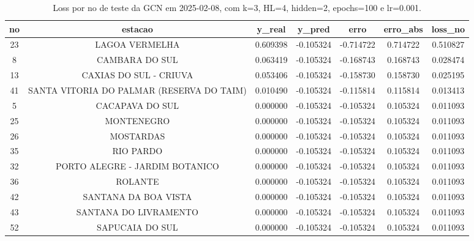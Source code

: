 \begin{table}[h]
\centering
\caption{Loss por no de teste da GCN em 2025-02-08, com k=3, HL=4, hidden=2, epochs=100 e lr=0.001.}
\label{tab:gcn_loss_k3_hl4_h2_e100_d20250208}
\begin{tabular}{ccccccc}
\toprule
no & estacao & y\_real & y\_pred & erro & erro\_abs & loss\_no \\
\midrule
23 & LAGOA VERMELHA & 0.609398 & -0.105324 & -0.714722 & 0.714722 & 0.510827 \\
8 & CAMBARA DO SUL & 0.063419 & -0.105324 & -0.168743 & 0.168743 & 0.028474 \\
13 & CAXIAS DO SUL - CRIUVA & 0.053406 & -0.105324 & -0.158730 & 0.158730 & 0.025195 \\
41 & SANTA VITORIA DO PALMAR (RESERVA DO TAIM) & 0.010490 & -0.105324 & -0.115814 & 0.115814 & 0.013413 \\
5 & CACAPAVA DO SUL & 0.000000 & -0.105324 & -0.105324 & 0.105324 & 0.011093 \\
25 & MONTENEGRO & 0.000000 & -0.105324 & -0.105324 & 0.105324 & 0.011093 \\
26 & MOSTARDAS & 0.000000 & -0.105324 & -0.105324 & 0.105324 & 0.011093 \\
35 & RIO PARDO & 0.000000 & -0.105324 & -0.105324 & 0.105324 & 0.011093 \\
32 & PORTO ALEGRE - JARDIM BOTANICO & 0.000000 & -0.105324 & -0.105324 & 0.105324 & 0.011093 \\
36 & ROLANTE & 0.000000 & -0.105324 & -0.105324 & 0.105324 & 0.011093 \\
42 & SANTANA DA BOA VISTA & 0.000000 & -0.105324 & -0.105324 & 0.105324 & 0.011093 \\
43 & SANTANA DO LIVRAMENTO & 0.000000 & -0.105324 & -0.105324 & 0.105324 & 0.011093 \\
52 & SAPUCAIA DO SUL & 0.000000 & -0.105324 & -0.105324 & 0.105324 & 0.011093 \\
\bottomrule
\end{tabular}
\end{table}
